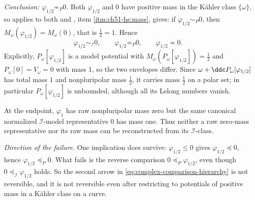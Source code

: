 \begin{example}
\emph{Conclusion: \(\varphi_{1/2}\not\sim_P0\).}  Both
\(\varphi_{1/2}\) and \(0\)
have positive mass in the K\"ahler class \(\{\omega\}\), so
 applies to both and
, item \cref{itm:ch51-hs:mass}, gives:
if \(\varphi_{1/2}\sim_P0\), then
\(M_\omega(\varphi_{1/2})=M_\omega(0)\), that is \(\tfrac12=1\).  Hence
\[
 \varphi_{1/2}\sim_{\mathcal I}0,
 \qquad
 \varphi_{1/2}\not\sim_P0,
 \qquad
 \varphi_{1/2}\not\sim0 .
\]
Explicitly, \(P_\omega[\varphi_{1/2}]\) is a model potential with
\(M_\omega(P_\omega[\varphi_{1/2}])=\tfrac12\) and
\(P_\omega[0]=V_\omega=0\) with mass \(1\), so the two envelopes differ.
Since \(\omega+\ddc P_\omega[\varphi_{1/2}]\) has total mass \(1\) and
nonpluripolar mass \(\tfrac12\), it carries mass \(\tfrac12\) on a polar
set; in particular \(P_\omega[\varphi_{1/2}]\) is unbounded, although all its
Lelong numbers vanish.

At the endpoint, \(\varphi_1\) has raw nonpluripolar mass zero but the
same canonical normalized \(\mathcal I\)-model representative \(0\) has
mass one.  Thus neither a raw zero-mass representative nor its raw mass can
be reconstructed from its \(\mathcal I\)-class.

\emph{Direction of the failure.}  One implication does survive:
\(\varphi_{1/2}\leq0\) gives \(\varphi_{1/2}\preceq0\), hence
\(\varphi_{1/2}\preceq_P0\).  What fails is the reverse comparison
\(0\preceq_P\varphi_{1/2}\), even though
\(0\preceq_{\mathcal I}\varphi_{1/2}\) holds.
So the second arrow in \eqref{eq:complex-comparison-hierarchy} is not
reversible, and it is not reversible even after restricting to potentials
of positive mass in a K\"ahler class on a curve.
\end{example}
